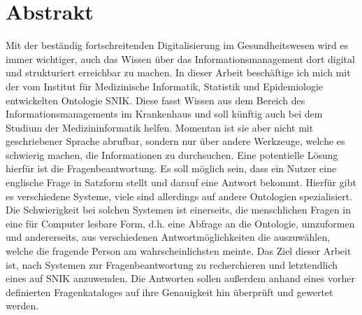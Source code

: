 \chapter*{Abstrakt}
Mit der beständig fortschreitenden Digitalisierung im Gesundheitswesen wird es immer wichtiger, auch das Wissen über das Informationsmanagement dort digital und strukturiert erreichbar zu machen. In dieser Arbeit beschäftige ich mich mit der vom Institut für Medizinische Informatik, Statistik und Epidemiologie entwickelten Ontologie SNIK.
Diese fasst Wissen aus dem Bereich des Informationsmanagements im Krankenhaus und soll künftig auch bei dem Studium der Medizininformatik helfen. Momentan ist sie aber nicht mit geschriebener Sprache abrufbar, sondern nur über andere Werkzeuge, welche es schwierig machen, die Informationen zu durchsuchen. Eine potentielle Lösung hierfür ist die Fragenbeantwortung. Es soll möglich sein, dass ein Nutzer eine englische Frage in Satzform stellt und darauf eine Antwort bekommt. Hierfür gibt es verschiedene Systeme, viele sind allerdings auf andere Ontologien spezialisiert. Die Schwierigkeit bei solchen Systemen ist einerseits, die menschlichen Fragen in eine für Computer lesbare Form, d.h. eine Abfrage an die Ontologie, umzuformen und andererseits, aus verschiedenen Antwortmöglichkeiten die auszuwählen, welche die fragende Person am wahrscheinlichsten meinte.
Das Ziel dieser Arbeit ist, nach Systemen zur Fragenbeantwortung zu recherchieren und letztendlich eines auf SNIK anzuwenden. Die Antworten sollen außerdem anhand eines vorher definierten Fragenkataloges auf ihre Genauigkeit hin überprüft und gewertet werden.
\vfill
